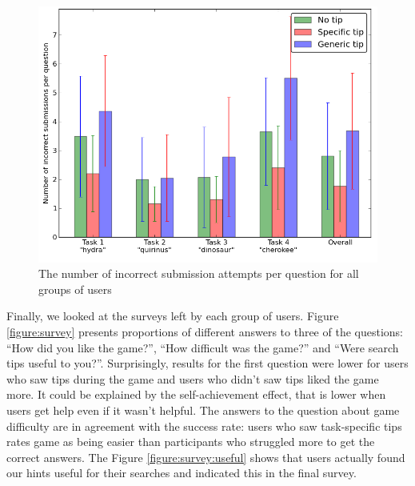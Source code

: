 \documentclass{sig-alternate}
\begin{document}
\begin{figure}[ht]
\centering
\includegraphics[scale=0.4]{img/incorrect}
\caption{The number of incorrect submission attempts per question for all groups of users}
\label{figure:incorrect}
\end{figure}

Finally, we looked at the surveys left by each group of users.
Figure \ref{figure:survey} presents proportions of different answers to three of the questions: ``How did you like the game?'', ``How difficult was the game?'' and ``Were search tips useful to you?''.
Surprisingly, results for the first question were lower for users who saw tips during the game and users who didn't saw tips liked the game more.
It could be explained by the self-achievement effect, that is lower when users get help even if it wasn't helpful. The answers to the question about game difficulty are in agreement with the success rate: users who saw task-specific tips rates game as being easier than participants who struggled more to get the correct answers. The Figure \ref{figure:survey:useful} shows that users actually found our hints useful for their searches and indicated this in the final survey.
\end{document}
